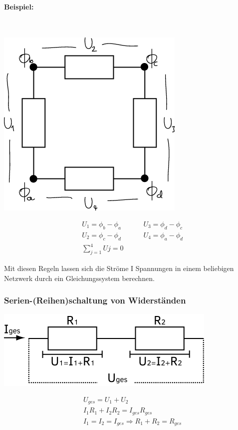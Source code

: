 \documentclass[11pt]{article}
\begin{document}
	\begin{minipage}{\textwidth}
	\paragraph{Beispiel:} \hfill \\
	\begin{center}
		\includegraphics[width=0.4\linewidth]{skizzen/15/15_4-6/15_5B1}
	\end{center}
	

	\begin{align*}
	&U_1 = \phi_b - \phi_a \hspace{1cm} & U_3 = \phi_d - \phi_c \\
	&U_2 = \phi_c - \phi_d \hspace{1cm} & U_4 = \phi_a - \phi_d \\
	&{\displaystyle\sum_{j=1}^{4} Uj} = 0
	\end{align*}
	\end{minipage}
	\break
	
	\noindent Mit diesen Regeln lassen sich die Ströme  I Spannungen in einem beliebigen Netzwerk durch ein Gleichungssystem berechnen.
	
	\subsubsection{Serien-(Reihen)schaltung von Widerständen}
	\begin{center}
		\includegraphics[width=0.5\linewidth]{skizzen/15/15_4-6/15_5B2}
	\end{center}
	 \noindent
	\begin{align*}
		&U_{ges} = U_1 + U_2 \\
		&I_1R_1+I_2R_2=I_{ges}R_{ges} \\
		&I_1=I_2=I_{ges} \Rightarrow \boxed{R_1+R_2=R_{ges}}
	\end{align*}
\end{document}
